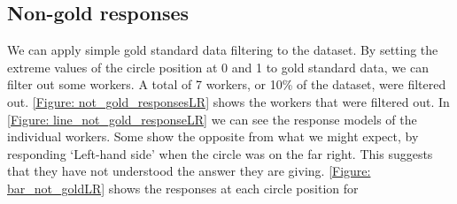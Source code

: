 \subsection{Non-gold responses}

We can apply  simple gold standard data filtering to the dataset. By setting the extreme values of the circle position at 0 and 1 to gold standard data, we can filter out some workers. A total of 7 workers, or 10\% of the dataset, were filtered out. \ref{Figure: not_gold_responsesLR} shows the workers that were filtered out. In \ref{Figure: line_not_gold_responseLR} we can see the response models of the individual workers. Some show the opposite from what we might expect, by responding `Left-hand side' when the circle was on the far right. This suggests that they have not understood the answer they are giving. \ref{Figure: bar_not_goldLR} shows the responses at each circle position for 


